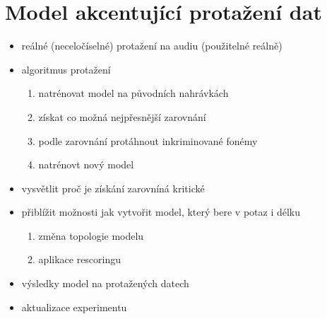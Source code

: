 \section{Model akcentující protažení dat}
\label{chap:realisation:durationmodels}

\begin{itemize}
  \item reálné (neceločíselné) protažení na audiu (použitelné reálně)
  \item algoritmus protažení
  \begin{enumerate}
    \item natrénovat model na původních nahrávkách
    \item získat co možná nejpřesnější zarovnání
    \item podle zarovnání protáhnout inkriminované fonémy
    \item natrénovt nový model
  \end{enumerate}
  \item vysvětlit proč je získání zarovníná kritické
  \item přiblížit možnosti jak vytvořit model, který bere v potaz i délku
  \begin{enumerate}
    \item změna topologie modelu
    \item aplikace rescoringu
  \end{enumerate}
  \item výsledky model na  protažených datech
  \item aktualizace experimentu 
\end{itemize}
